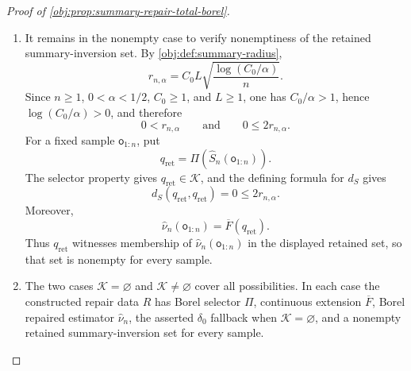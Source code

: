 \begin{proof}[Proof of \cref{obj:prop:summary-repair-total-borel}]
\begin{enumerate}
\item It remains in the nonempty case to verify nonemptiness of the retained summary-inversion set.  By \cref{obj:def:summary-radius},
\[
r_{n,\alpha}
=
C_0L\sqrt{\frac{\log(C_0/\alpha)}{n}} .
\]
Since \(n\ge 1\), \(0<\alpha<1/2\), \(C_0\ge 1\), and \(L\ge 1\), one has \(C_0/\alpha>1\), hence \(\log(C_0/\alpha)>0\), and therefore
\[
0<r_{n,\alpha}
\qquad\text{and}\qquad
0\le 2r_{n,\alpha}.
\]
For a fixed sample \(\mathsf o_{1:n}\), put
\[
q_{\mathrm{ret}}=\Pi(\widehat S_n(\mathsf o_{1:n})) .
\]
The selector property gives \(q_{\mathrm{ret}}\in\mathcal K\), and the defining formula for \(d_S\) gives
\[
d_S(q_{\mathrm{ret}},q_{\mathrm{ret}})=0\le 2r_{n,\alpha}.
\]
Moreover,
\[
\widehat\nu_n(\mathsf o_{1:n})
=
\overline F(q_{\mathrm{ret}}).
\]
Thus \(q_{\mathrm{ret}}\) witnesses membership of \(\widehat\nu_n(\mathsf o_{1:n})\) in the displayed retained set, so that set is nonempty for every sample. \hfill{}%

\item The two cases \(\mathcal K=\varnothing\) and \(\mathcal K\ne\varnothing\) cover all possibilities.  In each case the constructed repair data \(R\) has Borel selector \(\Pi\), continuous extension \(\overline F\), Borel repaired estimator \(\widehat\nu_n\), the asserted \(\delta_0\) fallback when \(\mathcal K=\varnothing\), and a nonempty retained summary-inversion set for every sample. \hfill{}%
\end{enumerate}
\end{proof}

